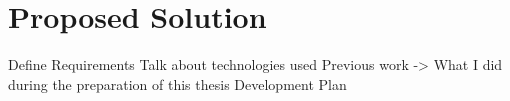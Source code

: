 
%

\chapter{Proposed Solution}
\label{cha:proposed_solution}


Define Requirements
Talk about technologies used
Previous work -> What I did during the preparation of this thesis
Development Plan
